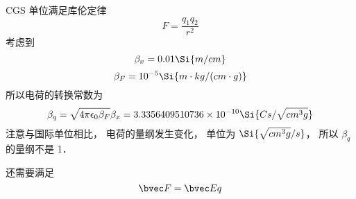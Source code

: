 
\begin{issues}
\issueDraft
\end{issues}


CGS 单位满足库伦定律
\begin{equation}
F = \frac{q_1 q_2}{r^2}
\end{equation}
考虑到
\begin{equation}
\beta_x = 0.01 \Si{m/cm}
\end{equation}
\begin{equation}
\beta_F = 10^{-5} \Si{m\cdot kg/(cm\cdot g)}
\end{equation}
所以电荷的转换常数为
\begin{equation}
\beta_q = \sqrt{4\pi\epsilon_0\beta_F} \beta_x = 3.3356409510736\times 10^{-10} \Si{Cs/\sqrt{cm^3 g}}
\end{equation}
注意与国际单位相比， 电荷的量纲发生变化， 单位为 $\Si{\sqrt{cm^3 g}/s}$， 所以 $\beta_q$ 的量纲不是 1．

还需要满足
\begin{equation}
\bvec F = \bvec E q
\end{equation}
